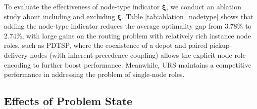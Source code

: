 \documentclass{article}
\theoremstyle{plain}
\theoremstyle{definition}
\theoremstyle{remark}
\begin{document}
\begin{table}[htbp]
  \centering
  \caption{The ablation study of the node-type indicator on trained VRPs}
  \label{tab:ablation_nodetype}%
\end{table}%
To evaluate the effectiveness of node-type indicator $\bm{\xi}$, we conduct an ablation study about including and excluding $\bm{\xi}$. Table \ref{tab:ablation_nodetype} shows that adding the node-type indicator reduces the average optimality gap from 3.78\% to 2.74\%, with large gains on the routing problem with relatively rich instance node roles, such as PDTSP, where the coexistence of a depot and paired pickup-delivery nodes (with inherent precedence coupling) allows the explicit node-role encoding to further boost performance. Meanwhile, URS maintains a competitive performance in addressing the problem of single-node roles.

\subsection{Effects of Problem State}
\label{append:ablation_constraints}
\end{document}
